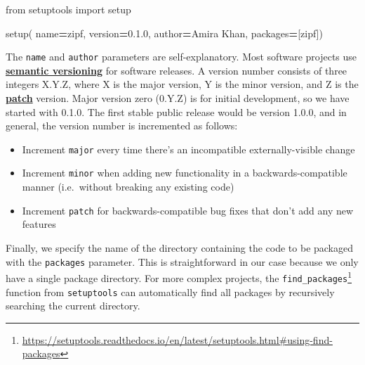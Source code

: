 \documentclass[
]{krantz}
\makeatletter
\newenvironment{Shaded}{\begin{snugshade}}{\end{snugshade}}
\newcommand{\ImportTok}[1]{#1}
\newcommand{\NormalTok}[1]{#1}
\newcommand{\OperatorTok}[1]{\textcolor[rgb]{0.81,0.36,0.00}{\textbf{#1}}}
\newcommand{\StringTok}[1]{\textcolor[rgb]{0.31,0.60,0.02}{#1}}
\providecommand{\tightlist}{%
  \setlength{\itemsep}{0pt}\setlength{\parskip}{0pt}}
\renewcommand{\href}[2]{#2\footnote{\url{#1}}}
\newenvironment{kframe}{%
\medskip{}
\setlength{\fboxsep}{.8em}
 \def\at@end@of@kframe{}%
 \ifinner\ifhmode%
  \def\at@end@of@kframe{\end{minipage}}%
  \begin{minipage}{\columnwidth}%
 \fi\fi%
 \def\FrameCommand##1{\hskip\@totalleftmargin \hskip-\fboxsep
 \colorbox{shadecolor}{##1}\hskip-\fboxsep
     \hskip-\linewidth \hskip-\@totalleftmargin \hskip\columnwidth}%
 \MakeFramed {\advance\hsize-\width
   \@totalleftmargin\z@ \linewidth\hsize
   \@setminipage}}%
 {\par\unskip\endMakeFramed%
 \at@end@of@kframe}
\renewenvironment{Shaded}{\begin{kframe}}{\end{kframe}}
\newcommand{\gref}[2]{\hyperlink{#2}{\textbf{#1}}}
\makeatother
\begin{document}
\begin{Shaded}
\begin{Highlighting}[]
\ImportTok{from}\NormalTok{ setuptools }\ImportTok{import}\NormalTok{ setup}


\NormalTok{setup(}
\NormalTok{    name}\OperatorTok{=}\StringTok{\textquotesingle{}zipf\textquotesingle{}}\NormalTok{,}
\NormalTok{    version}\OperatorTok{=}\StringTok{\textquotesingle{}0.1.0\textquotesingle{}}\NormalTok{,}
\NormalTok{    author}\OperatorTok{=}\StringTok{\textquotesingle{}Amira Khan\textquotesingle{}}\NormalTok{,}
\NormalTok{    packages}\OperatorTok{=}\NormalTok{[}\StringTok{\textquotesingle{}zipf\textquotesingle{}}\NormalTok{])}
\end{Highlighting}
\end{Shaded}

The \texttt{name} and \texttt{author} parameters are self-explanatory.
Most software projects use \gref{semantic versioning}{semantic\_versioning}
for software releases.
A version number consists of three integers X.Y.Z,
where X is the major version,
Y is the minor version,
and Z is the \gref{patch}{patch} version.
Major version zero (0.Y.Z) is for initial development, so we have started with 0.1.0.
The first stable public release would be version 1.0.0,
and in general, the version number is incremented as follows:

\begin{itemize}
\tightlist
\item
  Increment \texttt{major} every time there's an incompatible externally-visible change
\item
  Increment \texttt{minor} when adding new functionality in a backwards-compatible manner
  (i.e.~without breaking any existing code)
\item
  Increment \texttt{patch} for backwards-compatible bug fixes that don't add any new features
\end{itemize}

Finally,
we specify the name of the directory
containing the code to be packaged with the \texttt{packages} parameter.
This is straightforward in our case because we only have a single package directory.
For more complex projects,
the \href{https://setuptools.readthedocs.io/en/latest/setuptools.html\#using-find-packages}{\texttt{find\_packages}} function from \texttt{setuptools}
can automatically find all packages by recursively searching the current directory.
\end{document}
